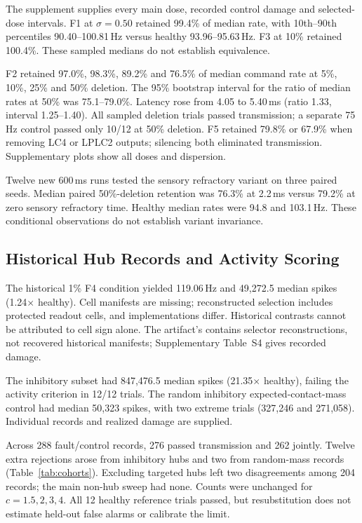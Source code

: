 The supplement supplies every main dose, recorded control damage and selected-dose intervals. F1 at $\sigma=0.50$ retained 99.4\% of median rate, with 10th--90th percentiles 90.40--100.81\,Hz versus healthy 93.96--95.63\,Hz. F3 at 10\% retained 100.4\%. These sampled medians do not establish equivalence.

F2 retained 97.0\%, 98.3\%, 89.2\% and 76.5\% of median command rate at 5\%, 10\%, 25\% and 50\% deletion. The 95\% bootstrap interval for the ratio of median rates at 50\% was 75.1--79.0\%. Latency rose from 4.05 to 5.40\,ms (ratio 1.33, interval 1.25--1.40). All sampled deletion trials passed transmission; a separate 75\,Hz control passed only 10/12 at 50\% deletion. F5 retained 79.8\% or 67.9\% when removing LC4 or LPLC2 outputs; silencing both eliminated transmission. Supplementary plots show all doses and dispersion.

Twelve new 600\,ms runs tested the sensory refractory variant on three paired seeds. Median paired 50\%-deletion retention was 76.3\% at 2.2\,ms versus 79.2\% at zero sensory refractory time. Healthy median rates were 94.8 and 103.1\,Hz. These conditional observations do not establish variant invariance.

\subsection{Historical Hub Records and Activity Scoring}
The historical 1\% F4 condition yielded 119.06\,Hz and 49{,}272.5 median spikes (1.24$\times$ healthy). Cell manifests are missing; reconstructed selection includes protected readout cells, and implementations differ. Historical contrasts cannot be attributed to cell sign alone. The artifact's  contains selector reconstructions, not recovered historical manifests; Supplementary Table~S4 gives recorded damage.

The inhibitory subset had 847{,}476.5 median spikes (21.35$\times$ healthy), failing the activity criterion in 12/12 trials. The random inhibitory expected-contact-mass control had median 50{,}323 spikes, with two extreme trials (327{,}246 and 271{,}058). Individual records and realized damage are supplied.

Across 288 fault/control records, 276 passed transmission and 262 jointly. Twelve extra rejections arose from inhibitory hubs and two from random-mass records (Table~\ref{tab:cohorts}). Excluding targeted hubs left two disagreements among 204 records; the main non-hub sweep had none. Counts were unchanged for $c=1.5,2,3,4$. All 12 healthy reference trials passed, but resubstitution does not estimate held-out false alarms or calibrate the limit.

